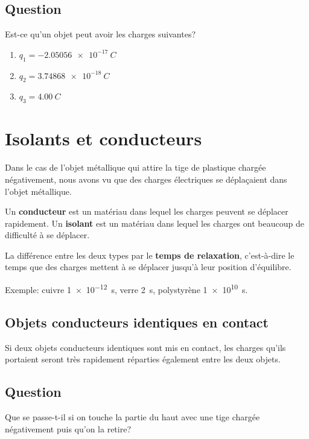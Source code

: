 \subsection*{Question}
Est-ce qu'un objet peut avoir les charges suivantes?

  \begin{enumerate}
    \item $q_1 = \SI{-2.05056e-17}{C}$
    \item $q_2 = \SI{3.74868e-18}{C}$
    \item $q_3 = \SI{4.00}{C}$
  \end{enumerate}


\sectionline


\section{Isolants et conducteurs}

  Dans le cas de l'objet métallique qui attire la tige de plastique chargée
  négativement, nous avons vu que des charges électriques se déplaçaient dans
  l'objet métallique.

  \vspace{0.3cm}
  Un \textbf{conducteur} est un matériau dans lequel les charges peuvent se
  déplacer rapidement. Un \textbf{isolant} est un matériau dans lequel les
  charges ont beaucoup de difficulté à se déplacer.

  \vspace{0.3cm}
  La différence entre les deux types par le \textbf{temps de relaxation},
  c'est-à-dire le temps que des charges mettent à se déplacer jusqu'à leur
  position d'équilibre.

  \vspace{0.3cm}
  Exemple: cuivre \SI{1e-12}{\second}, verre \SI{2}{\second}, polystyrène
  \SI{1e10}{\second}.



\subsection*{Objets conducteurs identiques en contact}
  Si deux objets conducteurs identiques sont mis en contact, les charges
  qu'ils portaient seront très rapidement réparties également entre les deux
  objets.


\subsection*{Question}
Que se passe-t-il si on touche la partie du haut avec une tige chargée
négativement puis qu'on la retire?



